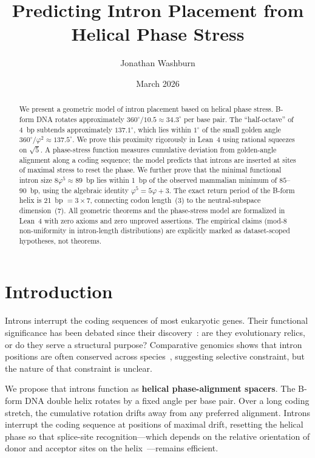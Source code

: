 \documentclass[11pt,twocolumn]{article}
\title{Predicting Intron Placement from Helical Phase Stress}
\author[1]{Jonathan Washburn}
\affil[1]{Independent Researcher}
\date{March 2026}
\begin{document}
\maketitle

\begin{abstract}
We present a geometric model of intron placement based on helical phase
stress. B-form DNA rotates approximately $360^\circ / 10.5 \approx 34.3
^\circ$ per base pair. The ``half-octave'' of 4~bp subtends approximately
$137.1^\circ$, which lies within $1^\circ$ of the small golden angle
$360^\circ / \varphi^2 \approx 137.5^\circ$. We prove this proximity
rigorously in Lean~4 using rational squeezes on $\sqrt{5}$. A phase-stress
function measures cumulative deviation from golden-angle alignment along a
coding sequence; the model predicts that introns are inserted at sites of
maximal stress to reset the phase. We further prove that the minimal
functional intron size $8\varphi^5 \approx 89$~bp lies within 1~bp of the
observed mammalian minimum of $85$--$90$~bp, using the algebraic identity
$\varphi^5 = 5\varphi + 3$. The exact return period of the B-form helix is
21~bp $= 3 \times 7$, connecting codon length~(3) to the neutral-subspace
dimension~(7). All geometric theorems and the phase-stress model are
formalized in Lean~4 with zero axioms and zero unproved assertions. The
empirical claims (mod-8 non-uniformity in intron-length distributions) are
explicitly marked as dataset-scoped hypotheses, not theorems.
\end{abstract}

\section{Introduction}

Introns interrupt the coding sequences of most eukaryotic genes. Their
functional significance has been debated since their
discovery~\cite{Berget1977, Chow1977}: are they evolutionary relics, or do
they serve a structural purpose? Comparative genomics shows that intron
positions are often conserved across species~\cite{Rogozin2003}, suggesting
selective constraint, but the nature of that constraint is unclear.

We propose that introns function as \textbf{helical phase-alignment
spacers}. The B-form DNA double helix rotates by a fixed angle per base
pair. Over a long coding stretch, the cumulative rotation drifts away from
any preferred alignment. Introns interrupt the coding sequence at positions
of maximal drift, resetting the helical phase so that splice-site
recognition---which depends on the relative orientation of donor and
acceptor sites on the helix~\cite{Lim2001}---remains efficient.
\end{document}
